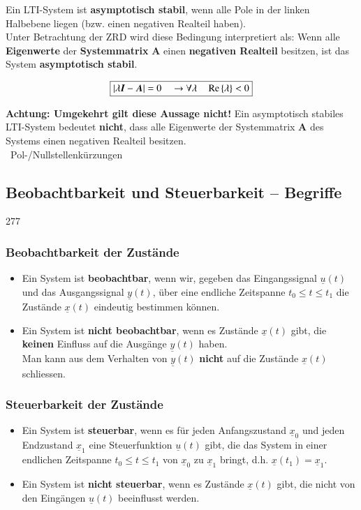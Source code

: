 Ein LTI-System ist \textbf{asymptotisch stabil}, wenn alle Pole in der linken Halbebene liegen (bzw. einen negativen Realteil haben). \\
Unter Betrachtung der ZRD wird diese Bedingung interpretiert als:
Wenn alle \textbf{Eigenwerte} der \textbf{Systemmatrix} $\bm{A}$ einen \textbf{negativen Realteil} besitzen, ist das System 
\textbf{asymptotisch stabil}.

$$ \boxed{ \left|\lambda \bm{I} - \bm{A}\right|  = 0 \quad \rightarrow \forall \lambda \quad \operatorname{Re}\left\{\lambda\right\} < 0 }  $$

\textbf{Achtung: Umgekehrt gilt diese Aussage nicht!} Ein asymptotisch stabiles LTI-System bedeutet \textbf{nicht}, 
dass alle Eigenwerte der Systemmatrix $\bm{A}$ des Systems einen negativen Realteil besitzen. \\
\textrightarrow\ Pol-/Nullstellenkürzungen


\subsection{Beobachtbarkeit und Steuerbarkeit -- Begriffe}{277}

\subsubsection*{Beobachtbarkeit der Zustände}

\begin{itemize}
    \item Ein System ist \textbf{beobachtbar}, wenn wir, gegeben das Eingangssignal $\underline{u}(t)$ und das Ausgangssignal $\underline{y}(t)$,
        über eine endliche Zeitspanne $t_0 \leq t \leq t_1$ die Zustände $\underline{x}(t)$ eindeutig bestimmen können. 
    \item Ein System ist \textbf{nicht beobachtbar}, wenn es Zustände $\underline{x}(t)$ gibt, die \textbf{keinen} Einfluss
        auf die Ausgänge $\underline{y}(t)$ haben. \\   
        \textrightarrow Man kann aus dem Verhalten von $\underline{y}(t)$ \textbf{nicht} auf die Zustände $\underline{x}(t)$ schliessen.
\end{itemize}


\subsubsection*{Steuerbarkeit der Zustände}

\begin{itemize}
    \item Ein System ist \textbf{steuerbar}, wenn es für jeden Anfangszustand $\underline{x}_0$ und jeden Endzustand $\underline{x}_1$
        eine Steuerfunktion $\underline{u}(t)$ gibt, die das System in einer endlichen Zeitspanne $t_0 \leq t \leq t_1$ von
        $\underline{x}_0$ zu $\underline{x}_1$ bringt, d.h. $\underline{x}(t_1) = \underline{x}_1$. 
    \item Ein System ist \textbf{nicht steuerbar}, wenn es Zustände $\underline{x}(t)$ gibt, die nicht von den 
        Eingängen $\underline{u}(t)$ beeinflusst werden. 
\end{itemize}

